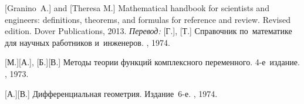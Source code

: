 \begin{thebibliography}{123}
\begin{otherlanguage}{russian}
[Granino~A.] and [Theresa M.]
Mathematical handbook for scientists and engineers: definitions, theorems, and formulas for reference and review.
Revised edition. Dover Publications, 2013. 
\emph{Перевод:}
[Г.],
[Т.]
Справочник по~математике для научных работников и~инженеров.
\naukapublisher,
1974.

[М.][А.],
[Б.][В.]
Методы теории функций комплексного переменного.
4\hbox{-}е~издание.
\naukapublisher,
1973.

[А.][В.]
Дифференциальная геометрия.
Издание~6\hbox{-}е.
\naukapublisher,
1974.

\end{otherlanguage}

\normalsize
\end{thebibliography}

